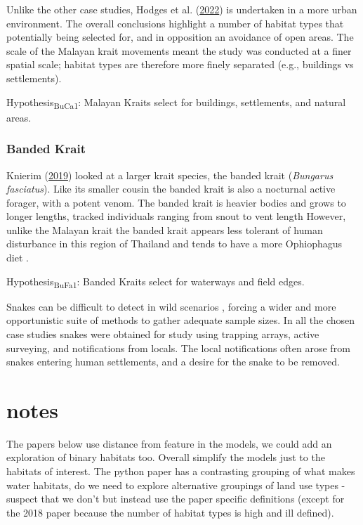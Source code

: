 \documentclass[10pt,a4paper]{article}
\begin{document}
Unlike the other case studies, Hodges et al. (\protect\hyperlink{ref-hodges_malayan_2022}{2022}) is undertaken in a more urban environment.
The overall conclusions highlight a number of habitat types that potentially being selected for, and in opposition an avoidance of open areas.
The scale of the Malayan krait movements meant the study was conducted at a finer spatial scale; habitat types are therefore more finely separated (e.g., buildings vs settlements).

Hypothesis\textsubscript{BuCa1}: Malayan Kraits select for buildings, settlements, and natural areas.

\hypertarget{banded-krait}{%
\subsubsection{Banded Krait}\label{banded-krait}}

Knierim (\protect\hyperlink{ref-knierim_spatial_2019}{2019}) looked at a larger krait species, the banded krait (\emph{Bungarus fasciatus}).
Like its smaller cousin the banded krait is also a nocturnal active forager, with a potent venom.
The banded krait is heavier bodies and grows to longer lengths, tracked individuals ranging from snout to vent length
However, unlike the Malayan krait the banded krait appears less tolerant of human disturbance in this region of Thailand and tends to have a more Ophiophagus diet .

Hypothesis\textsubscript{BuFa1}: Banded Kraits select for waterways and field edges.

Snakes can be difficult to detect in wild scenarios , forcing a wider and more opportunistic suite of methods to gather adequate sample sizes.
In all the chosen case studies snakes were obtained for study using trapping arrays, active surveying, and notifications from locals.
The local notifications often arose from snakes entering human settlements, and a desire for the snake to be removed.

\hypertarget{notes}{%
\section{notes}\label{notes}}

The papers below use distance from feature in the models, we could add an exploration of binary habitats too.
Overall simplify the models just to the habitats of interest.
The python paper has a contrasting grouping of what makes water habitats, do we need to explore alternative groupings of land use types - suspect that we don't but instead use the paper specific definitions (except for the 2018 paper because the number of habitat types is high and ill defined).
\end{document}

